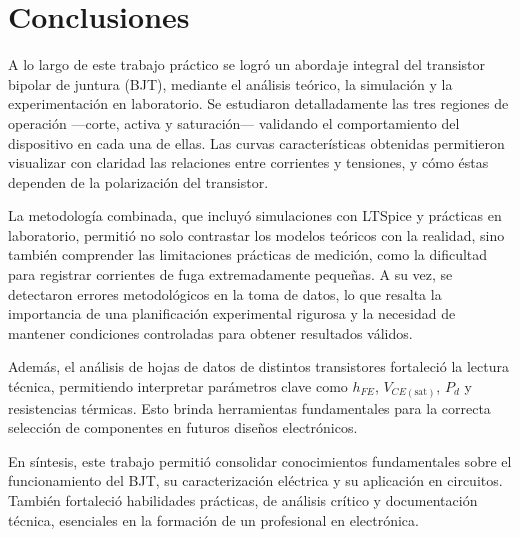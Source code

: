 \chapter{Conclusiones}
  A lo largo de este trabajo práctico se logró un abordaje integral del transistor bipolar de juntura (BJT), mediante el
  análisis teórico, la simulación y la experimentación en laboratorio. Se estudiaron detalladamente las tres regiones de
  operación —corte, activa y saturación— validando el comportamiento del dispositivo en cada una de ellas. Las curvas
  características obtenidas permitieron visualizar con claridad las relaciones entre corrientes y tensiones, y cómo
  éstas dependen de la polarización del transistor.
  
  La metodología combinada, que incluyó simulaciones con LTSpice y prácticas en laboratorio, permitió no solo contrastar
  los modelos teóricos con la realidad, sino también comprender las limitaciones prácticas de medición, como la
  dificultad para registrar corrientes de fuga extremadamente pequeñas. A su vez, se detectaron errores metodológicos en
  la toma de datos, lo que resalta la importancia de una planificación experimental rigurosa y la necesidad de mantener
  condiciones controladas para obtener resultados válidos.
  
  Además, el análisis de hojas de datos de distintos transistores fortaleció la lectura técnica, permitiendo interpretar
  parámetros clave como $h_{FE}$, $V_{CE(\text{sat})}$, $P_d$ y resistencias térmicas. Esto brinda herramientas
  fundamentales para la correcta selección de componentes en futuros diseños electrónicos.
  
  En síntesis, este trabajo permitió consolidar conocimientos fundamentales sobre el funcionamiento del BJT, su
  caracterización eléctrica y su aplicación en circuitos. También fortaleció habilidades prácticas, de análisis crítico
  y documentación técnica, esenciales en la formación de un profesional en electrónica.
